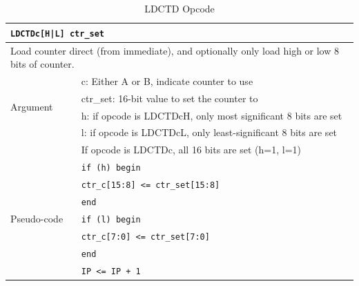 \documentclass[main\_\_EN.tex]{subfiles}
\begin{document}
\begin{table}[H]
\caption{LDCTD Opcode}
\label{tab:bitscrm-ldctd-opcode}
\begin{tabular}{|l|l|}
\hline
\multicolumn{2}{|l|}{\texttt{LDCTDc[H|L] ctr\_set}} \\
\hline
\multicolumn{2}{|L{17cm}|}{Load counter direct (from immediate), and optionally only load high or low 8 bits of counter.} \\
\hline
\multirow{4}{*}{Argument} & c: Either A or B, indicate counter to use \\
& ctr\_set: 16-bit value to set the counter to \\
& h: if opcode is LDCTDcH, only most significant 8 bits are set \\
& l: if opcode is LDCTDcL, only least-significant 8 bits are set \\
& If opcode is LDCTDc, all 16 bits are set (h=1, l=1)\\
\hline
\multirow{7}{*}{Pseudo-code} & \texttt{if (h) begin} \\
& \hspace*{4mm} \texttt{ctr\_c[15:8] <= ctr\_set[15:8]} \\
& \texttt{end} \\
& \texttt{if (l) begin} \\
& \hspace*{4mm} \texttt{ctr\_c[7:0] <= ctr\_set[7:0]} \\
& \texttt{end} \\
& \texttt{IP <= IP + 1} \\
\hline
\end{tabular}
\end{table}
\end{document}
